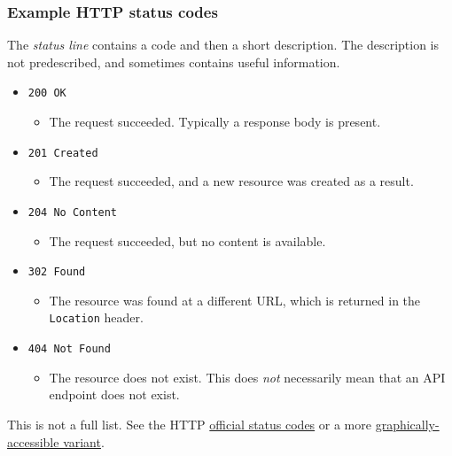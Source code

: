\documentclass[8pt]{article}
\begin{document}
\subsubsection{Example HTTP status codes}
\label{sec:org96d2335}
The \emph{status line} contains a code and then a short description. The description is not predescribed, and sometimes contains useful information.
\begin{itemize}
\item \texttt{200 OK}
\begin{itemize}
\item The request succeeded. Typically a response body is present.
\end{itemize}
\item \texttt{201 Created}
\begin{itemize}
\item The request succeeded, and a new resource was created as a result.
\end{itemize}
\item \texttt{204 No Content}
\begin{itemize}
\item The request succeeded, but no content is available.
\end{itemize}
\item \texttt{302 Found}
\begin{itemize}
\item The resource was found at a different URL, which is returned in the \texttt{Location} header.
\end{itemize}
\item \texttt{404 Not Found}
\begin{itemize}
\item The resource does not exist. This does \emph{not} necessarily mean that an API endpoint does not exist.
\end{itemize}
\end{itemize}

This is not a full list. See the HTTP \href{https://en.wikipedia.org/wiki/List\_of\_HTTP\_status\_codes}{official status codes} or a more \href{https://http.cat/401}{graphically-accessible variant}.
\end{document}
